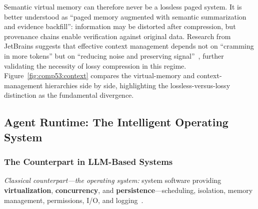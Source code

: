 Semantic virtual memory can therefore never be a lossless paged system.
It is better understood as ``paged memory augmented with semantic summarization and evidence backfill'': information may be distorted after compression, but provenance chains enable verification against original data.
Research from JetBrains suggests that effective context management depends not on ``cramming in more tokens'' but on ``reducing noise and preserving signal''~\cite{jetbrains2025context}, further validating the necessity of lossy compression in this regime.
Figure~\ref{fig:comp53:context} compares the virtual-memory and context-management hierarchies side by side, highlighting the lossless-versus-lossy distinction as the fundamental divergence.



\subsection{Agent Runtime: The Intelligent Operating System}
\label{sec:agent}

\subsubsection{The Counterpart in LLM-Based Systems}

\textit{Classical counterpart---the operating system:} system software providing \textbf{virtualization}, \textbf{concurrency}, and \textbf{persistence}---scheduling, isolation, memory management, permissions, I/O, and logging~\cite{ostep_2023}.

